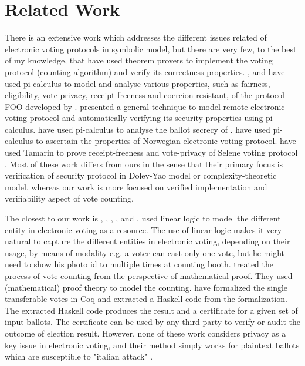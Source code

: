 \section{Related Work}
 There is an extensive work which 
 addresses the different issues related of electronic voting protocols  in symbolic model, 
 but there are very few, to the best of my knowledge, 
 that have used theorem provers to implement the voting protocol (counting algorithm)
 and verify its correctness properties. 
 \citep{10.1007/978-3-540-31987-0_14}, and  \citep{Delaune2010} have used pi-calculus to model 
 and analyse various properties, such as fairness, eligibility, vote-privacy, receipt-freeness and 
 coercion-resistant,  
 of the protocol FOO developed by \citep{10.1007/3-540-57220-1_66}.  \citep{Backes:2008:AVR:1380848.1381255}
 presented a general technique to model  remote electronic 
 voting protocol and automatically verifying  its security properties using pi-calculus. 
 \citep{5992139} have used pi-calculus to analyse the ballot secrecy of \citep{Helios:2016:HVS}.
 \citep{10.1007/978-3-642-28641-4_7} have used pi-calculus to ascertain the properties of 
 Norwegian electronic voting protocol.
 \citep{10.1007/978-3-319-68687-5_7} have used Tamarin  to prove receipt-freeness 
 and vote-privacy of Selene voting protocol \citep{Selene}.  Most of these work differs from ours
 in the sense that their primary focus is verification of security protocol in  
 Dolev-Yao model or  complexity-theoretic model, whereas our work is 
 more focused on verified implementation and  verifiability  aspect of vote counting.

 The closest to our work is \citep{DeYoung:2012:LLV}, \citep{Pattinson:2015:VCM}, \citep{Pattinson:2016:MSP},
 \citep{Verity:2017:FVI:3014812.3014845}, and \citep{Ghale:2017:FVS}.  \citep{DeYoung:2012:LLV} 
 used linear logic\citep{GIRARD19871} to model the different entity in electronic voting as a resource. 
 The use of linear logic makes it very natural to capture the different entities in electronic voting,  
 depending on their usage, by means of modality e.g. a voter can cast only one vote, but he might 
 need to show his photo id to multiple times at counting booth. \citep{Pattinson:2015:VCM} treated 
 the process of vote counting from
 the perspective of mathematical proof. They used (mathematical) proof theory to model the 
 counting. \citep{Ghale:2017:FVS} have formalized the single transferable votes in Coq and 
 extracted a Haskell code from the formalization. The extracted Haskell code produces the result 
 and a certificate for a given set of input ballots. The certificate can be used by any third party to verify 
 or audit the outcome of election result.  However, none of these work considers privacy as a key 
 issue in electronic voting, and their method simply works for plaintext ballots which are  susceptible to 
 "italian attack"  \citep{Otten}   \citep{Benaloh:2009:SSC}.

